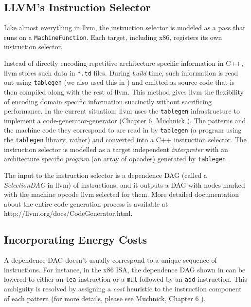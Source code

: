 \subsection{LLVM's Instruction Selector}

Like almost everything in llvm, the instruction selector is modeled as
a pass that runs on a \texttt{MachineFunction}.  Each target,
including x86, registers its own instruction selector.

Instead of directly encoding repetitive architecture specific
information in C++, llvm stores such data in \texttt{*.td}
files. During \textit{build} time, such information is read out using
\texttt{tablegen} (we also used this in )
and emitted as source code that is then compiled along with the rest
of llvm. This method gives llvm the flexibility of encoding domain
specific information succinctly without sacrificing performance.  In
the current situation, llvm uses the \texttt{tablegen} infrastructure
to implement a code-generator-generator (Chapter 6, Muchnick
\cite{muchnick}). The patterns and the machine code they correspond to
are read in by \texttt{tablegen} (a program using the
\texttt{tablegen} library, rather) and converted into a C++
instruction selector.  The instruction selector is modelled as a
target independent \textit{interpreter} with an architecture specific
\textit{program} (an array of opcodes) generated by \texttt{tablegen}.

The input to the instruction selector is a dependence DAG (called a
\textit{SelectionDAG} in llvm) of instructions, and it outputs a DAG
with nodes marked with the machine opcode llvm selected for them.
More detailed documentation about the entire code generation process
is available at http://llvm.org/docs/CodeGenerator.html.

\subsection{Incorporating Energy Costs}

A dependence DAG doesn't usually correspond to a unique sequence of
instructions.  For instance, in the x86 ISA, the dependence DAG shown
in  can be lowered to either an \texttt{lea}
instruction or a \texttt{mul} followed by an \texttt{add} instruction.
This ambiguity is resolved by assigning a \textit{cost} heuristic to
the instruction component of each pattern (for more details, please
see Muchnick, Chapter 6 \cite{muchnick}).

